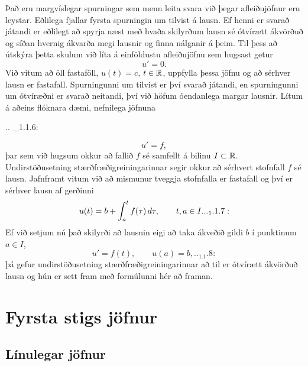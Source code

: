Það eru margvíslegar spurningar sem menn leita svara við þegar
afleiðujöfnur eru leystar.  Eðlilega fjallar fyrsta spurningin um
tilvist á lausn.  Ef henni er svarað játandi er eðlilegt að spyrja
næst með hvaða skilyrðum lausn sé ótvírætt ákvörðuð og síðan
hvernig ákvarða megi lausnir  og finna nálganir á þeim.
Til þess að útskýra þetta skulum við líta á
einföldustu afleiðujöfnu sem hugsast getur
$$u'=0.$$
Við vitum að öll fastaföll, $u(t)=c$, $t\in{\mathbb R}$, uppfylla þessa jöfnu
og að sérhver lausn er fastafall.
Spurningunni um tilvist er því svarað játandi, en spurningunni um ótvíræðni
er svarað neitandi, því  við höfum óendanlega margar lausnir.  Lítum á
aðeins flóknara dæmi, nefnilega jöfnuna

.. _1.1.6:

\begin{equation*}u'=f, 
\end{equation*}
þar sem við hugsum okkur að fallið $f$ sé samfellt á bilinu $I\subset
{\mathbb R}$.  Undirstöðusetning stærðfræðigreiningarinnar segir okkur að
sérhvert stofnfall $f$ sé lausn.  Jafnframt vitum við að mismunur
tveggja stofnfalla er fastafall og því er sérhver lausn af gerðinni
 \begin{equation*}
 u(t)=b+\int_a\sp t f(\tau) \, d\tau, \qquad t,a\in I.

.. _1.1.7:

 \end{equation*}
Ef við setjum nú það skilyrði að lausnin eigi að taka ákveðið gildi $b$ 
í punktinum $a\in I$, 
 \begin{equation*}u'=f(t), \qquad u(a)=b,

.. _1.1.8:

 \end{equation*}
þá gefur undirstöðusetning stærðfræðigreiningarinnar að til er 
ótvírætt ákvörðuð lausn og hún er sett fram með formúlunni hér að framan.

\section{Fyrsta stigs jöfnur}  


\subsection*{Línulegar jöfnur}


